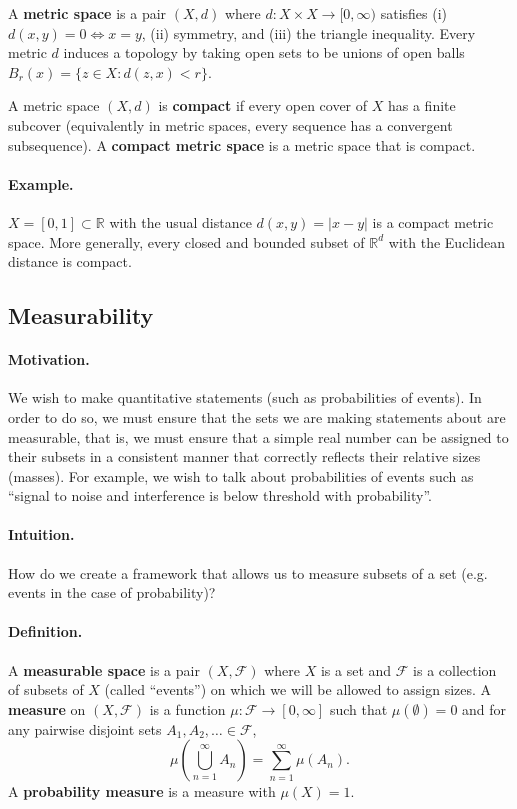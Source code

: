 A \textbf{metric space} is a pair $(X,d)$ where $d:X\times X\to[0,\infty)$ satisfies (i) $d(x,y)=0\Leftrightarrow x=y$,
(ii) symmetry, and (iii) the triangle inequality. Every metric $d$ induces a topology by taking open sets to be unions of
open balls $B_r(x)=\{z\in X:d(z,x)<r\}$.

A metric space $(X,d)$ is \textbf{compact} if every open cover of $X$ has a finite subcover (equivalently in metric
spaces, every sequence has a convergent subsequence). A \textbf{compact metric space} is a metric space that is compact.

\paragraph{Example.}
$X=[0,1]\subset\mathbb{R}$ with the usual distance $d(x,y)=|x-y|$ is a compact metric space.
More generally, every closed and bounded subset of $\mathbb{R}^d$ with the Euclidean distance is compact.

\subsection{Measurability}

\paragraph{Motivation.}
We wish to make quantitative statements (such as probabilities of events). In order to do so, we
must ensure that the sets we are making statements about are measurable, that is, we must ensure that 
a simple real number can be assigned to their subsets in a consistent manner that correctly reflects their 
relative sizes (masses). For example, we wish to talk about probabilities of events such as 
``signal to noise and interference is below threshold with probability''.

\paragraph{Intuition.}
How do we create a framework that allows us to measure subsets of a set (e.g. events in the case of probability)? 

\paragraph{Definition.}
A \textbf{measurable space} is a pair $(X,\mathcal{F})$ where $X$ is a set and $\mathcal{F}$ is a collection of subsets
of $X$ (called ``events'') on which we will be allowed to assign sizes.
A \textbf{measure} on $(X,\mathcal{F})$ is a function $\mu:\mathcal{F}\to[0,\infty]$ such that $\mu(\emptyset)=0$ and
for any pairwise disjoint sets $A_1,A_2,\dots \in \mathcal{F}$,
$$
\mu\!\left(\bigcup_{n=1}^\infty A_n\right)=\sum_{n=1}^\infty \mu(A_n).
$$
A \textbf{probability measure} is a measure with $\mu(X)=1$.

